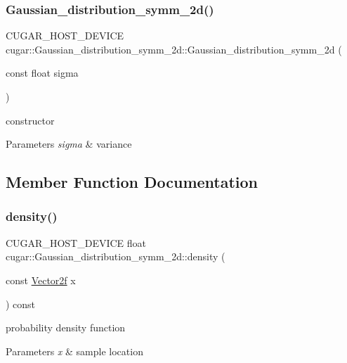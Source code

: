 \subsubsection{\texorpdfstring{Gaussian\+\_\+distribution\+\_\+symm\+\_\+2d()}{Gaussian\_distribution\_symm\_2d()}}
{\footnotesize\ttfamily C\+U\+G\+A\+R\+\_\+\+H\+O\+S\+T\+\_\+\+D\+E\+V\+I\+CE cugar\+::\+Gaussian\+\_\+distribution\+\_\+symm\+\_\+2d\+::\+Gaussian\+\_\+distribution\+\_\+symm\+\_\+2d (\begin{DoxyParamCaption}\item[{const float}]{sigma }\end{DoxyParamCaption})\hspace{0.3cm}{\ttfamily [inline]}}

constructor


\begin{DoxyParams}{Parameters}
{\em sigma} & variance \\
\hline
\end{DoxyParams}


\subsection{Member Function Documentation}
\mbox{\label{structcugar_1_1_gaussian__distribution__symm__2d_a8fdc5e8ef2ffed25026ff5ad69d0d1c5}} 
\subsubsection{\texorpdfstring{density()}{density()}}
{\footnotesize\ttfamily C\+U\+G\+A\+R\+\_\+\+H\+O\+S\+T\+\_\+\+D\+E\+V\+I\+CE float cugar\+::\+Gaussian\+\_\+distribution\+\_\+symm\+\_\+2d\+::density (\begin{DoxyParamCaption}\item[{const \hyperlink{structcugar_1_1_vector}{Vector2f}}]{x }\end{DoxyParamCaption}) const\hspace{0.3cm}{\ttfamily [inline]}}

probability density function


\begin{DoxyParams}{Parameters}
{\em x} & sample location \\
\hline
\end{DoxyParams}
\mbox{\label{structcugar_1_1_gaussian__distribution__symm__2d_aed7b256d5d53d1840e68298b6d92bee2}} 
